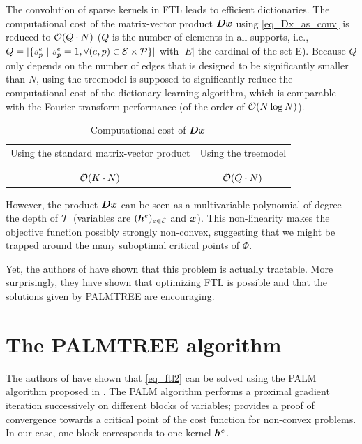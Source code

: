 The convolution of sparse kernels in \ac{FTL} leads to efficient dictionaries. The computational cost of the matrix-vector product $\bm{D}\bm{x}$ using \cref{eq_Dx_as_conv} is reduced to $\mathcal{O}(Q \cdot N)$ ($Q$ is the number of elements in all supports, i.e., $Q=|\{s^e_p ~|~ s^e_p = 1, \forall (e,p) \in \mathcal E \times \mathcal P\}|$ with $|E|$ the cardinal of the set E). Because $Q$ only depends on the number of edges that is designed to be significantly smaller than  $N$, using the \gls{treemodel} is supposed to significantly reduce the computational cost of the dictionary learning algorithm, which is comparable with the Fourier transform performance (of the order of $\mathcal{O}(N \log N)$).

\begin{table}[!ht] \centering 
\caption{Computational cost of $\bm{D}\bm{x}$}\label{table_comparison_Dx_costs}
\begin{tabular}{c|c}
Using the standard matrix-vector product & Using the \gls{treemodel} \\\\ \hline \\
$\mathcal{O}(K \cdot N)$ & $\mathcal{O}(Q \cdot N)$
\end{tabular}
\end{table}


\noindent
However, the product $\bm{D}\bm{x}$ can be seen as a multivariable polynomial of degree the depth of $\mathcal T$ (variables are $(\bm{h}^e)_{e \in \mathcal E}$ and $\bm{x}$). This non-linearity makes the objective function possibly strongly non-convex, suggesting that we might be trapped around the many suboptimal critical points of $\Phi$.

\noindent
Yet, the authors of \cite{chabiron_optimization_2016} have shown that this problem is actually tractable. More surprisingly, they have shown that optimizing \ac{FTL} is possible and that the solutions given by \acs{PALMTREE} are encouraging.


\section{The PALMTREE algorithm}\label{sec_palmtree}

The authors of \cite{chabiron_optimization_2016} have shown that \eqref{eq_ftl2} can be solved using the \ac{PALM} algorithm proposed in \cite{bolte_proximal_2014}. The \ac{PALM} algorithm performs a proximal gradient iteration successively on different blocks of variables; \cite{bolte_proximal_2014} provides a proof of convergence towards a critical point of the cost function for non-convex problems. In our case, one block corresponds to one kernel $\bm{h}^e$.

